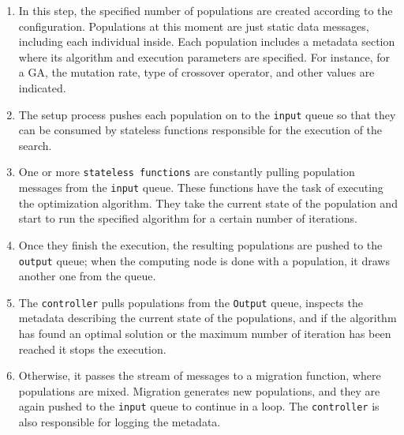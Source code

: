 \begin{enumerate}

\item In this step, the specified number of populations are created according
to the configuration. Populations at this moment are just static data messages,
including each individual inside. Each population includes a metadata section
where its algorithm and execution parameters are specified. For instance, for a
GA, the mutation rate, type of crossover operator, and other values are
indicated.

\item The setup process pushes each population on to the \texttt{input}
queue so that they can be consumed by stateless functions responsible for the
execution of the search.

\item One or more \texttt{stateless functions} are constantly pulling
population messages from the \texttt{input} queue. These functions have the
task of executing the optimization algorithm. They take the current state of
the population and start to run the specified algorithm for a certain number of
iterations.

\item Once they finish the execution, the resulting populations are pushed to
the \texttt{output} queue; when the computing node is done with a population, it draws another one from the
queue.

\item The \texttt{controller} pulls populations from the \texttt{Output} queue,
inspects the metadata describing the current state of the populations, and if
the algorithm has found an optimal solution or the maximum number of iteration
has been reached it stops the execution.

\item Otherwise, it passes the stream of messages to a migration function,
where populations are mixed. Migration generates new populations, and they are
again pushed to the \texttt{input} queue to continue in a loop. The
\texttt{controller} is also responsible for logging the metadata.

\end{enumerate}

